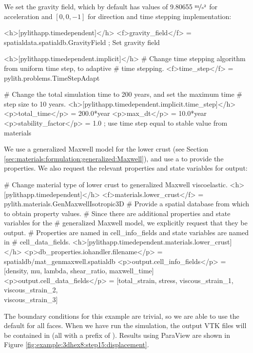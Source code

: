 We set the gravity field, which by default has values of 9.80655
$\unitfrac{m}{s^{2}}$ for acceleration and $\left[0,0,-1\right]$
for direction and time stepping implementation:
\begin{cfg}
<h>[pylithapp.timedependent]</h>
<f>gravity_field</f> = spatialdata.spatialdb.GravityField ; Set gravity field

<h>[pylithapp.timedependent.implicit]</h>
# Change time stepping algorithm from uniform time step, to adaptive
# time stepping.
<f>time_step</f> = pylith.problems.TimeStepAdapt

# Change the total simulation time to 200 years, and set the maximum time
# step size to 10 years.
<h>[pylithapp.timedependent.implicit.time_step]</h>
<p>total_time</p> = 200.0*year
<p>max_dt</p> = 10.0*year
<p>stability_factor</p> = 1.0 ; use time step equal to stable value from materials
\end{cfg}

We use a generalized Maxwell model for the lower crust (see Section
\vref{sec:materials:formulation:generalized:Maxwell}), and use a  to
provide the properties. We also request the relevant properties and
state variables for output:
\begin{cfg}
# Change material type of lower crust to generalized Maxwell viscoelastic.
<h>[pylithapp.timedependent]</h>
<f>materials.lower_crust</f> = pylith.materials.GenMaxwellIsotropic3D
# Provide a spatial database from which to obtain property values.
# Since there are additional properties and state variables for the
# generalized Maxwell model, we explicitly request that they be output.
# Properties are named in cell\_info\_fields and state variables are named in
# cell\_data\_fields.
<h>[pylithapp.timedependent.materials.lower_crust]</h>
<p>db_properties.iohandler.filename</p> = spatialdb/mat\_genmaxwell.spatialdb
<p>output.cell_info_fields</p> = [density, mu, lambda, shear_ratio, maxwell_time]
<p>output.cell_data_fields</p> = [total_strain, stress, viscous_strain_1, viscous_strain_2, \\
  viscous_strain_3]
\end{cfg}
The boundary conditions for this example are trivial, so we are able
to use the default  for all faces. When we have
run the simulation, the output VTK files will be contained in 
(all with a prefix of ). Results using ParaView are
shown in Figure \vref{fig:example:3dhex8:step15:displacement}.

